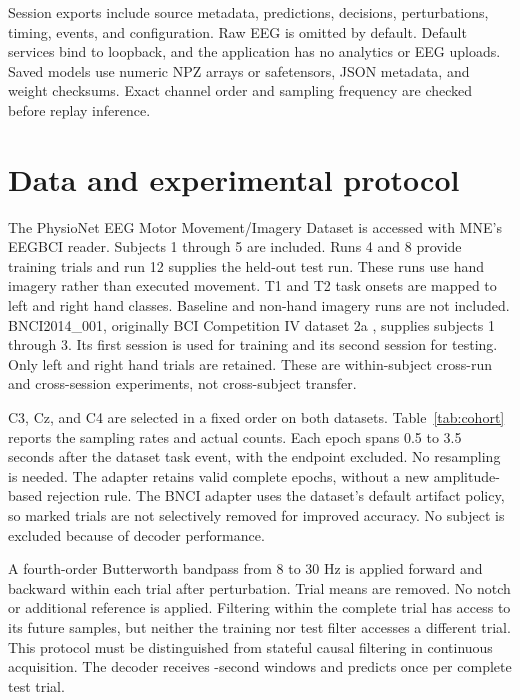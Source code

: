 \documentclass[11pt]{article}
\begin{document}
Session exports include source metadata, predictions, decisions, perturbations, timing, events, and configuration. Raw EEG is omitted by default. Default services bind to loopback, and the application has no analytics or EEG uploads. Saved models use numeric NPZ arrays or safetensors, JSON metadata, and weight checksums. Exact channel order and sampling frequency are checked before replay inference.

\section{Data and experimental protocol}
\begin{table}[t]
\centering
\caption{Included cohort and complete-trial counts, generated from the completed experiment manifest. Train and test counts are totals within each dataset. Both tasks are imagined left and right hand movement.}
\label{tab:cohort}
\end{table}
The PhysioNet EEG Motor Movement/Imagery Dataset \citep{physionet} is accessed with MNE's EEGBCI reader. Subjects 1 through 5 are included. Runs 4 and 8 provide training trials and run 12 supplies the held-out test run. These runs use hand imagery rather than executed movement. T1 and T2 task onsets are mapped to left and right hand classes. Baseline and non-hand imagery runs are not included. BNCI2014\_001, originally BCI Competition IV dataset 2a \citep{bnci}, supplies subjects 1 through 3. Its first session is used for training and its second session for testing. Only left and right hand trials are retained. These are within-subject cross-run and cross-session experiments, not cross-subject transfer.

C3, Cz, and C4 are selected in a fixed order on both datasets. Table~\ref{tab:cohort} reports the sampling rates and actual counts. Each epoch spans 0.5 to 3.5 seconds after the dataset task event, with the endpoint excluded. No resampling is needed. The adapter retains valid complete epochs, without a new amplitude-based rejection rule. The BNCI adapter uses the dataset's default artifact policy, so marked trials are not selectively removed for improved accuracy. No subject is excluded because of decoder performance.

A fourth-order Butterworth bandpass from 8 to 30 Hz is applied forward and backward within each trial after perturbation. Trial means are removed. No notch or additional reference is applied. Filtering within the complete trial has access to its future samples, but neither the training nor test filter accesses a different trial. This protocol must be distinguished from stateful causal filtering in continuous acquisition. The decoder receives \EpochSeconds{}-second windows and predicts once per complete test trial.
\end{document}
